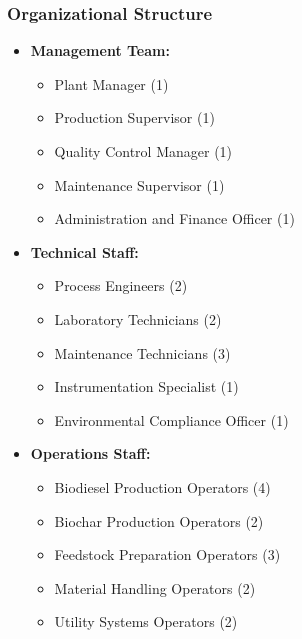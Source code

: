 \subsubsection{Organizational Structure}
\begin{itemize}
    \item \textbf{Management Team:}
    \begin{itemize}
        \item Plant Manager (1)
        \item Production Supervisor (1)
        \item Quality Control Manager (1)
        \item Maintenance Supervisor (1)
        \item Administration and Finance Officer (1)
    \end{itemize}
    
    \item \textbf{Technical Staff:}
    \begin{itemize}
        \item Process Engineers (2)
        \item Laboratory Technicians (2)
        \item Maintenance Technicians (3)
        \item Instrumentation Specialist (1)
        \item Environmental Compliance Officer (1)
    \end{itemize}
    
    \item \textbf{Operations Staff:}
    \begin{itemize}
        \item Biodiesel Production Operators (4)
        \item Biochar Production Operators (2)
        \item Feedstock Preparation Operators (3)
        \item Material Handling Operators (2)
        \item Utility Systems Operators (2)
    \end{itemize}
\end{itemize}

